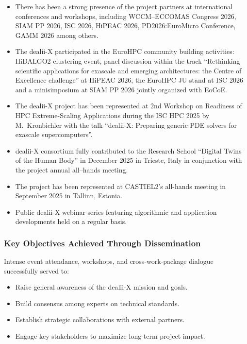 \documentclass[a4paper,12pt, numbers]{article}
\begin{document}
\begin{itemize}[left=1em, itemsep=0pt, topsep=0pt]
\item There has been a strong presence of the project partners at international conferences and workshops, including WCCM--ECCOMAS Congress 2026, SIAM PP 2026, ISC 2026, HiPEAC 2026, PD2026:EuroMicro Conference, GAMM 2026 among others.
\item The dealii-X participated in the EuroHPC community building activities: HiDALGO2 clustering event, panel discussion within the track ``Rethinking scientific applications for exascale and emerging architectures: the Centre of Excellence challenge'' at HiPEAC 2026, the EuroHPC JU stand at ISC 2026 and a minisimposium at SIAM PP 2026 jointly organized with EoCoE.
\item The dealii-X project has been represented at 2nd Workshop on Readiness of HPC Extreme-Scaling Applications during the ISC HPC 2025 by M.~Kronbichler with the talk ``dealii-X: Preparing generic PDE solvers for exascale supercomputers''.
\item dealii-X consortium fully contributed to the Research School ``Digital Twins of the Human Body'' in December 2025 in Trieste, Italy in conjunction with the project annual all--hands meeting.
\item The project has been represented at CASTIEL2's all-hands meeting in September 2025 in Tallinn, Estonia.  
\item Public dealii-X webinar series featuring algorithmic and application developments held on a regular basis.   
\end{itemize}

\subsubsection*{Key Objectives Achieved Through Dissemination}


Intense event attendance, workshops, and cross-work-package dialogue successfully served to:

\begin{itemize}
\item Raise general awareness of the dealii-X mission and goals.

\item Build consensus among experts on technical standards.

\item Establish strategic collaborations with external partners.

\item Engage key stakeholders to maximize long-term project impact.
\end{itemize}
\end{document}
